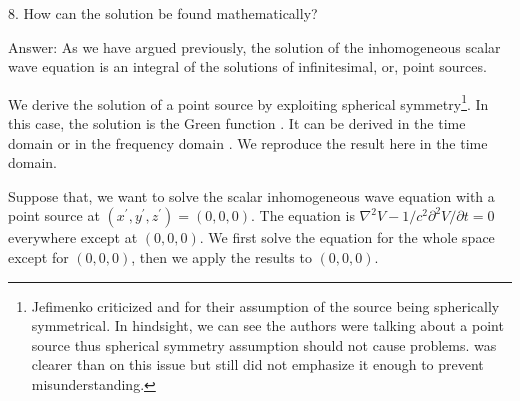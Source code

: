 \documentclass[11pt]{article}              %
\begin{document}
8. How can the solution be found mathematically?

Answer: As we have argued previously, the solution of the inhomogeneous scalar wave equation is an integral of the solutions of infinitesimal, or, point sources. 

We derive the solution of a point source by exploiting spherical symmetry\footnote{Jefimenko criticized \cite{becker1982electromagnetic} and \cite{heald1995classical} for their assumption of the source being spherically symmetrical. In hindsight, we can see the authors were talking about a point source thus spherical symmetry assumption should not cause problems. \cite{heald1995classical} was clearer than \cite{becker1982electromagnetic} on this issue but still did not emphasize it enough to prevent misunderstanding.}. In this case, the solution is the Green function \cite{panofsky1962classical} \cite{podolsky1969fundamentals} \cite{barut1980electrodynamics} \cite{jackson1998classical} \cite{melia2001electrodynamics} \cite{franklin2017classical}. It can be derived in the time domain 
\cite{podolsky1969fundamentals} \cite{landau1971classical} \cite{wangsness1986electromagnetic} \cite{pauli2000electrodynamics} \cite{steane2012relativity} \cite{zangwill2013modern} or in the frequency domain \cite{panofsky1962classical} \cite{jackson1998classical} \cite{schwinger1998classical} \cite{pauli2000electrodynamics} \cite{scheck2012classical} . We reproduce the result here in the time domain.

Suppose that, we want to solve the scalar inhomogeneous wave equation with a point source at $(x^\prime,y^\prime,z^\prime)=(0,0,0)$. The equation is $\nabla^2 V-1/c^2\partial^2 V/\partial t=0$ everywhere except at $(0,0,0)$. We first solve the equation for the whole space except for $(0,0,0)$, then we apply the results to $(0,0,0)$.
\end{document}
